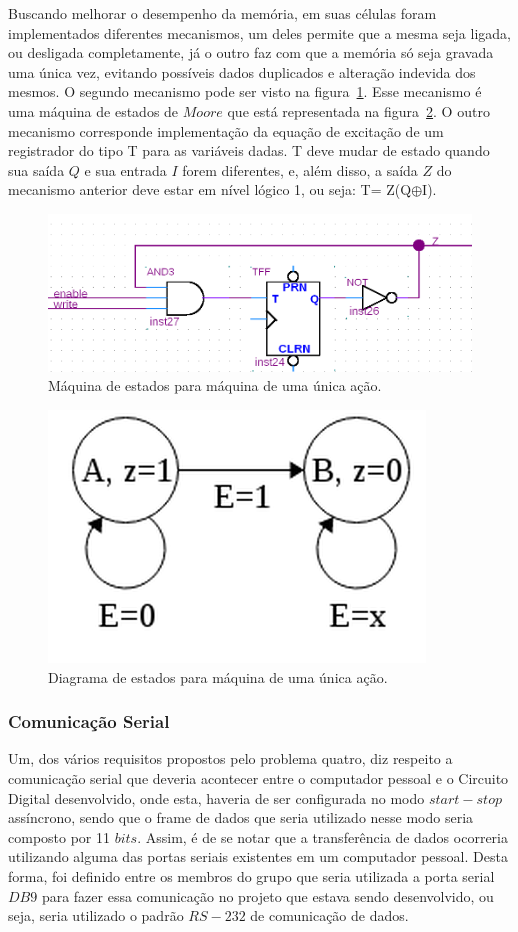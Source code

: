 \documentclass[12pt]{article}
\begin{document}
Buscando melhorar o desempenho da memória, em suas células foram implementados diferentes mecanismos, um deles permite que a mesma seja ligada, ou desligada completamente, já o outro faz com que a memória só seja gravada uma única vez, evitando possíveis dados duplicados e alteração indevida dos mesmos. O segundo mecanismo pode ser visto na figura~\ref{fig:ff1}. Esse mecanismo é uma máquina de estados de $Moore$ que está representada na figura~\ref{fig:fsm}. O outro mecanismo corresponde implementação da equação de excitação de um registrador do tipo T para as variáveis dadas. T deve mudar de estado quando sua saída $Q$ e sua entrada $I$ forem diferentes, e, além disso, a saída $Z$ do mecanismo anterior deve estar em nível lógico 1, ou seja: T= Z(Q$\oplus$I).

\begin{figure}[h]
\centering
\includegraphics[width=.8\textwidth]{img/ff1.png}
\caption{Máquina de estados para máquina de uma única ação.}
\label{fig:ff1}
\end{figure}

\begin{figure}[h]
\centering
\includegraphics[width=.3\textwidth]{img/fsm.png}
\caption{Diagrama de estados para máquina de uma única ação.}
\label{fig:fsm}
\end{figure}


\subsubsection{Comunicação Serial}

Um, dos vários requisitos propostos pelo problema quatro, diz respeito a comunicação serial que deveria acontecer entre o computador pessoal e o Circuito Digital desenvolvido, onde esta, haveria de ser configurada no modo $start-stop$ assíncrono, sendo que o frame de dados que seria utilizado nesse modo seria composto por 11 $bits$. Assim, é de se notar que a transferência de dados ocorreria utilizando alguma das portas seriais existentes em um computador pessoal. Desta forma, foi definido entre os membros do grupo que seria utilizada a porta serial $DB9$ para fazer essa comunicação no projeto que estava sendo desenvolvido, ou seja, seria utilizado o padrão $RS-232$ de comunicação de dados.
\end{document}
